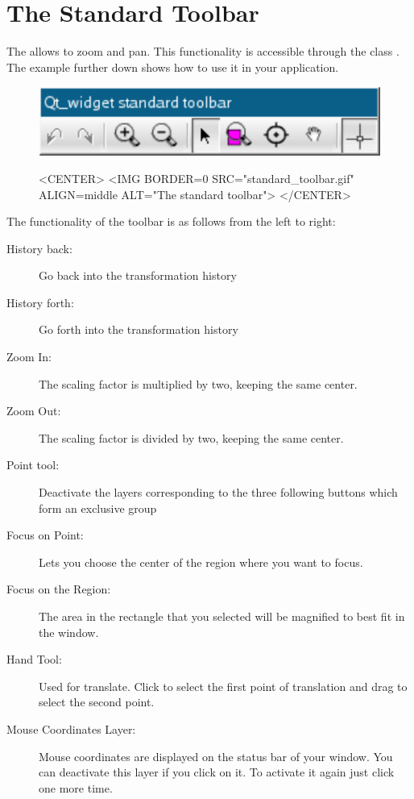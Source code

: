 \section{The Standard Toolbar}
\label{Qt_widget_standard_toolbar}

The  allows to zoom and pan. This functionality is 
accessible through the class . The 
example further down shows how to use it in your application.

\begin{figure}[h]
\begin{ccTexOnly}
\begin{center}
\includegraphics{Qt_widget/standard_toolbar} 
\end{center}
\end{ccTexOnly}
\begin{ccHtmlOnly}
<CENTER>
<IMG BORDER=0 SRC="standard_toolbar.gif"  ALIGN=middle  ALT="The
standard toolbar">
</CENTER>
\end{ccHtmlOnly}
\end{figure}

The functionality of the toolbar is as follows from the left to right:
\begin{description}
         \item[History back:] Go back into the transformation history
        \item[History forth:] Go forth into the transformation history
        \item[Zoom In:] The scaling factor is multiplied by two,
keeping the same center.
        \item[Zoom Out:] The scaling factor is divided by two, keeping
the same center.
       \item[Point tool:] Deactivate the layers corresponding to the
three following buttons which form an exclusive group
        \item[Focus on Point:] Lets you choose the center of the
region where you want to focus.
        \item[Focus on the Region:] The area in the rectangle that you selected will be magnified to best fit in the window.
        \item[Hand Tool:] Used for translate. Click to select the
first point of translation and drag to select the second point.
        \item[Mouse Coordinates Layer:] Mouse coordinates are
displayed on the status bar of your window.  You can deactivate this
layer if you click on it. To activate it again just click one more time.
\end{description}




